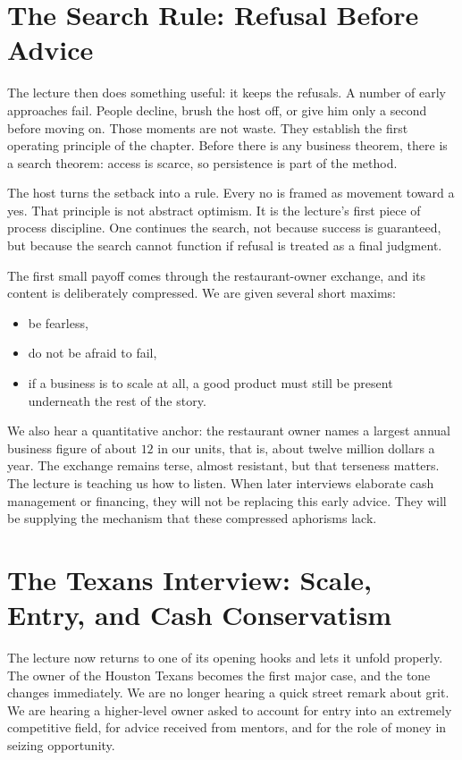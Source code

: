 \section{The Search Rule: Refusal Before Advice}

The lecture then does something useful: it keeps the refusals. A number of early approaches fail. People decline, brush the host off, or give him only a second before moving on. Those moments are not waste. They establish the first operating principle of the chapter. Before there is any business theorem, there is a search theorem: access is scarce, so persistence is part of the method.

The host turns the setback into a rule. Every no is framed as movement toward a yes. That principle is not abstract optimism. It is the lecture's first piece of process discipline. One continues the search, not because success is guaranteed, but because the search cannot function if refusal is treated as a final judgment.

The first small payoff comes through the restaurant-owner exchange, and its content is deliberately compressed. We are given several short maxims:
\begin{itemize}
\item be fearless,
\item do not be afraid to fail,
\item if a business is to scale at all, a good product must still be present underneath the rest of the story.
\end{itemize}
We also hear a quantitative anchor: the restaurant owner names a largest annual business figure of about \(12\) in our units, that is, about twelve million dollars a year. The exchange remains terse, almost resistant, but that terseness matters. The lecture is teaching us how to listen. When later interviews elaborate cash management or financing, they will not be replacing this early advice. They will be supplying the mechanism that these compressed aphorisms lack.

\section{The Texans Interview: Scale, Entry, and Cash Conservatism}

The lecture now returns to one of its opening hooks and lets it unfold properly. The owner of the Houston Texans becomes the first major case, and the tone changes immediately. We are no longer hearing a quick street remark about grit. We are hearing a higher-level owner asked to account for entry into an extremely competitive field, for advice received from mentors, and for the role of money in seizing opportunity.

